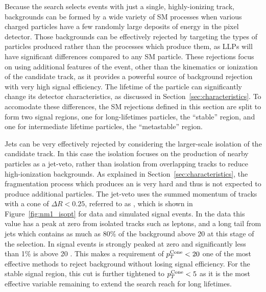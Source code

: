 Because the search selects events with just a single, highly-ionizing track, backgrounds can be formed by a wide variety of \ac{SM} processes when various charged particles have a few randomly large deposits of energy in the pixel detector.
Those backgrounds can be effectively rejected by targeting the types of particles produced rather than the processes which produce them, as \acp{LLP} will have significant differences compared to any \ac{SM} particle.
These rejections focus on using additional features of the event, other than the kinematics or ionization of the candidate track, as it provides a powerful source of background rejection with very high signal efficiency.
The lifetime of the particle can significantly change its detector characteristics, as discussed in Section~\ref{sec:characteristics}.
To accomodate these differences, the \ac{SM} rejections defined in this section are split to form two signal regions, one for long-lifetimes particles, the ``stable'' region, and one for intermediate lifetime particles, the ``metastable'' region.

Jets can be very effectively rejected by considering the larger-scale isolation of the candidate track.
In this case the isolation focuses on the production of nearby particles as a jet-veto, rather than isolation from overlapping tracks to reduce high-ionization backgrounds.
As explained in Section~\ref{sec:characteristics}, the fragmentation process which produces an \rhadron is very hard and thus is not expected to produce additional particles.
The jet-veto uses the summed momentum of tracks with a cone of $\Delta R < 0.25$, referred to as \ptcone, which is shown in Figure~\ref{fig:nm1_isopt} for data and simulated signal events. 
In the data this value has a peak at zero from isolated tracks such as leptons, and a long tail from jets which contains as much as 80\% of the background above 20 \GeV at this stage of the selection.
In signal events \ptcone is strongly peaked at zero and significantly less than 1\% is above 20 \GeV. 
This makes a requirement of $p_T^\mathrm{Cone} < 20$ \GeV one of the most effective methods to reject background without losing signal efficiency.
For the stable signal region, this cut is further tightened to $p_T^\mathrm{Cone} < 5$ \GeV as it is the most effective variable remaining to extend the search reach for long lifetimes. 

